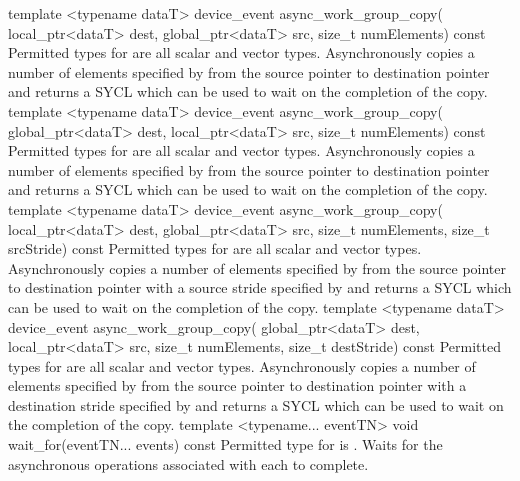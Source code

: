   \addRowFourL
    { template <typename dataT> }
    { device_event async_work_group_copy( }
    { local_ptr<dataT> dest, global_ptr<dataT> src, }
    { size_t numElements) const }
    {
      Permitted types for  are all scalar and vector types.
      Asynchronously copies a number of elements specified by  from the source pointer  to destination
      pointer  and returns a SYCL 
      which can be used to wait on the completion of the copy. 
    }
  \addRowFourL
    { template <typename dataT> }
    { device_event async_work_group_copy( }
    { global_ptr<dataT> dest, local_ptr<dataT> src, }
    { size_t numElements) const }
    {
      Permitted types for  are all scalar and vector types.
      Asynchronously copies a number of elements specified by  from the source pointer  to destination
      pointer  and returns a SYCL 
      which can be used to wait on the completion of the copy. 
    }
  \addRowFourL
    { template <typename dataT> }
    { device_event async_work_group_copy( }
    { local_ptr<dataT> dest, global_ptr<dataT> src, }
    { size_t numElements, size_t srcStride) const }
    {
      Permitted types for  are all scalar and vector types.
      Asynchronously copies a number of elements specified by  from the source pointer  to destination 
      pointer  with a source stride specified by
       and returns a SYCL 
      which can be used to wait on the completion of the copy. 
    }
  \addRowFourL
    { template <typename dataT> }
    { device_event async_work_group_copy( }
    { global_ptr<dataT> dest, local_ptr<dataT> src, }
    { size_t numElements, size_t destStride) const }
    {
      Permitted types for  are all scalar and vector types.
      Asynchronously copies a number of elements specified by  from the source pointer  to destination
      pointer  with a destination stride specified by
       and returns a SYCL 
      which can be used to wait on the completion of the copy. 
    }
  \addRowTwoL
    { template <typename... eventTN> }
    { void wait_for(eventTN... events) const }
    {
      Permitted type for  is .
      Waits for the asynchronous operations associated with each  to complete.
    }
\completeTable

